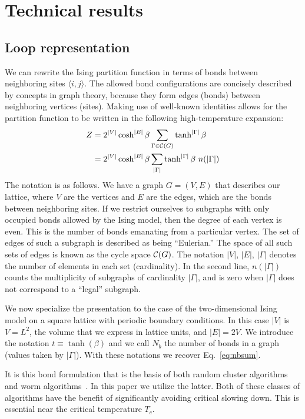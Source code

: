 \documentclass[../main.tex]{subfiles}
\begin{document}
\section{Technical results}%
\label{sec:technical_results}
\subsection{Loop representation}%
\label{ssec:loop_representation}
We can rewrite the Ising partition function in terms of bonds between neighboring sites $\langle i , j \rangle$. The
allowed bond configurations are concisely described by concepts in graph theory, because they form edges (bonds)
between neighboring vertices (sites). Making use of well-known identities allows for the partition function to be
written in the following high-temperature expansion:
\begin{align}
    Z &= 2^{|V|} \cosh^{|E|} \beta \sum_{\Gamma \in {\cal C}(G)}
    \tanh^{|\Gamma|} \beta \\
    &= 2^{|V|} \cosh^{|E|} \beta \sum_{|\Gamma|} \tanh^{|\Gamma|} \beta ~
    n(|\Gamma|)
\label{eq:z}
\end{align}
The notation is as follows. We have a graph $G=(V,E)$ that describes our lattice, where $V$ are the vertices and $E$
are the edges, which are the bonds between neighboring sites. If we restrict ourselves to subgraphs with only occupied
bonds allowed by the Ising model, then the degree of each vertex is even.  This is the number of bonds emanating from a
particular vertex. The set of edges of such a subgraph is described as being ``Eulerian.''  The space of all such sets
of edges is known as the cycle space ${\cal C}(G)$. The notation $|V|$, $|E|$, $|\Gamma|$ denotes the number of
elements in each set (cardinality).  In the second line, $n(|\Gamma|)$ counts the multiplicity of subgraphs of
cardinality $|\Gamma|$, and is zero when $|\Gamma|$ does not correspond to a ``legal'' subgraph.

We now specialize the presentation to the case of the two-dimensional Ising model on a square lattice with periodic
boundary conditions. In this case $|V|$ is $V=L^2$, the volume that we express in lattice units, and $|E| = 2V$. We
introduce the notation $t\equiv\tanh(\beta)$ and we call $N_b$ the number of bonds in a graph (values taken by
$|\Gamma|$). With these notations we recover Eq.~\ref{eq:nbsum}.

It is this bond formulation that is the basis of both random cluster algorithms~\cite{Swendsen:1987ce} and worm
algorithms~\cite{prok87}.
%
In this paper we utilize the latter.  Both of these classes of algorithms have the benefit of significantly avoiding
critical slowing down.  This is essential near the critical temperature $T_c$.
\end{document}
